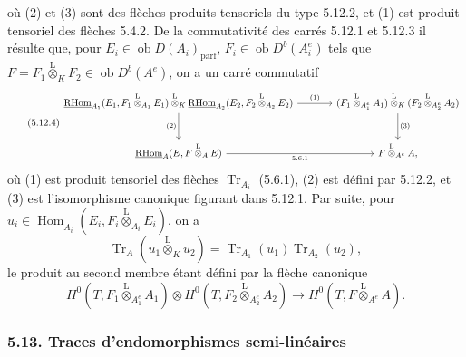 \documentclass[11pt]{article}
\DeclareMathOperator{\Hom}{Hom}
\newcommand{\R}{\mathrm{R}}\newcommand{\RHomCore}{\mathrm{RHom}}
\newcommand{\ob}{\operatorname{ob}}
\providecommand{\RHom}{\RHomCore}
\providecommand{\uRHom}{\underline{\RHom}}
\providecommand{\uHom}{\underline{\Hom}}
\providecommand{\Tr}{\operatorname{Tr}}
\providecommand{\Tr}{\operatorname{Tr}}
\providecommand{\lten}{\overset{\mathrm L}{\otimes}}
\providecommand{\Tr}{\operatorname{Tr}}
\providecommand{\RHom}{\RHomCore}
\providecommand{\Hom}{\operatorname{Hom}}
\providecommand{\ob}{\operatorname{ob}}
\providecommand{\lten}{\overset{\mathrm L}{\otimes}}
\providecommand{\RHom}{\R\mathcal{H}om}
\providecommand{\lten}{\overset{\mathrm L}{\otimes}}
\providecommand{\R}{\mathrm R}
\providecommand{\Tr}{\operatorname{Tr}}
\providecommand{\lten}{\overset{\mathrm L}{\otimes}}
\providecommand{\lten}{\overset{\mathrm L}{\otimes}}
\providecommand{\lten}{\overset{\mathrm L}{\otimes}}
\providecommand{\RHom}{\RHomCore}
\providecommand{\Hom}{\operatorname{Hom}}
\providecommand{\Tr}{\operatorname{Tr}}
\providecommand{\lten}{\overset{\mathrm L}{\otimes}}
\begin{document}
où (2) et (3) sont des flèches produits tensoriels du type 5.12.2, et (1) est produit tensoriel des flèches 5.4.2. De la commutativité des carrés 5.12.1 et 5.12.3 il résulte que, pour $E_i\in\ob D(A_i)_{\mathrm{parf}}$, $F_i\in\ob D^b(A_i^e)$ tels que $F=F_1\lten_KF_2\in\ob D^b(A^e)$, on a un carré commutatif
\begin{equation}\tag{5.12.4}
\begin{tikzcd}[column sep=large,row sep=large]
\uRHom_{A_1}(E_1,F_1\lten_{A_1}E_1)\lten_K\uRHom_{A_2}(E_2,F_2\lten_{A_2}E_2) \arrow[r,"(1)"] \arrow[d,"(2)"'] & (F_1\lten_{A_1^e}A_1)\lten_K(F_2\lten_{A_2^e}A_2) \arrow[d,"(3)"]\\
\uRHom_A(E,F\lten_AE) \arrow[r,"5.6.1"'] & F\lten_{A^e}A,
\end{tikzcd}
\end{equation}
où (1) est produit tensoriel des flèches $\Tr_{A_i}$ (5.6.1), (2) est défini par 5.12.2, et (3) est l'isomorphisme canonique figurant dans 5.12.1. Par suite, pour $u_i\in\uHom_{A_i}(E_i,F_i\lten_{A_i}E_i)$, on a
\begin{equation}\tag{5.12.5}
\Tr_A(u_1\lten_Ku_2)=\Tr_{A_1}(u_1)\Tr_{A_2}(u_2),
\end{equation}
le produit au second membre étant défini par la flèche canonique
\[
H^0(T,F_1\lten_{A_1^e}A_1)\otimes H^0(T,F_2\lten_{A_2^e}A_2)
\longrightarrow H^0(T,F\lten_{A^e}A).
\]

\subsubsection*{5.13. Traces d'endomorphismes semi-linéaires}
\end{document}
